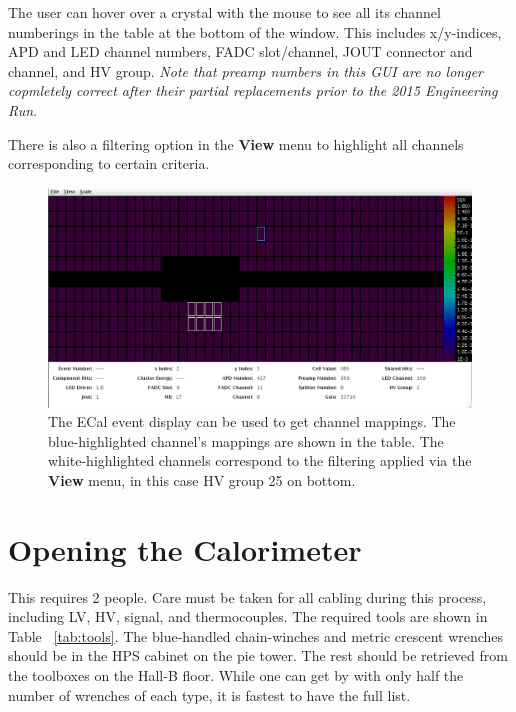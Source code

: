 \documentclass[12pt]{article}
\begin{document}
The user can hover over a crystal with the mouse to see all its channel numberings in the table at the bottom of the window.  This includes x/y-indices, APD and LED channel numbers, FADC slot/channel, JOUT connector and channel, and HV group.  {\em Note that preamp numbers in this GUI are no longer copmletely correct after their partial replacements prior to the 2015 Engineering Run}.  

There is also a filtering option in the {\bf View} menu to highlight all channels corresponding to certain criteria.

\begin{figure}[htbp]\centering
    \includegraphics[width=16cm]{pics/kylesGui.png}
    \caption{The ECal event display can be used to get channel mappings.  The blue-highlighted channel's mappings are shown in the table.  The white-highlighted channels correspond to the filtering applied via the {\bf View} menu, in this case HV group 25 on bottom.\label{fig:kylesGui}}
\end{figure}

\section{Opening the Calorimeter}

This requires 2 people.  Care must be taken for all cabling during this process, including LV, HV, signal, and thermocouples.  The required tools are shown in Table ~\ref{tab:tools}.  The blue-handled chain-winches and metric crescent wrenches should be in the HPS cabinet on the pie tower.  The rest should be retrieved from the toolboxes on the Hall-B floor.  While one can get by with only half the number of wrenches of each type, it is fastest to have the full list. 
\end{document}
